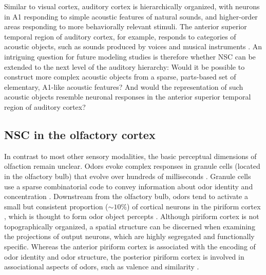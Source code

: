 Similar to visual cortex, auditory cortex is hierarchically organized,
with neurons in \ac{A1} responding to simple acoustic features of natural sounds,
and higher-order areas responding to more behaviorally relevant stimuli.
The anterior superior temporal region of auditory cortex, for example,
responds to categories of acoustic objects,
such as sounds produced by voices and musical instruments
\cite{Leaver2010}.
An intriguing question for future modeling studies is therefore 
whether \ac{NSC} can be extended to the next level of the auditory hierarchy:
Would it be possible to construct more complex acoustic objects from a sparse,
parts-based set of elementary, \ac{A1}-like acoustic features?
And would the representation of such acoustic objects resemble neuronal responses
in the anterior superior temporal region of auditory cortex?


\subsection*{NSC in the olfactory cortex}

In contrast to most other sensory modalities, 
the basic perceptual dimensions of olfaction remain unclear.
Odors evoke complex responses in granule cells (located in the olfactory bulb)
that evolve over hundreds of milliseconds \cite{Broome2006}.
Granule cells use a sparse combinatorial code to convey information about odor identity
and concentration \cite{Koulakov2011,Gupta2015}.
Downstream from the olfactory bulb, odors tend to activate a small but consistent
proportion ($\sim 10\%$) of cortical neurons in the piriform cortex \cite{poo2009},
which is thought to form odor object percepts \cite{chen2014,stettler2009}.
Although piriform cortex is not topographically organized,
a spatial structure can be discerned when examining the projections of output neurons,
which are highly segregated and functionally specific.
Whereas the anterior piriform cortex is associated with the encoding of 
odor identity and odor structure, 
the posterior piriform cortex is involved in associational aspects of odors, 
such as valence and similarity \cite{chen2014,gottfried2006}.

